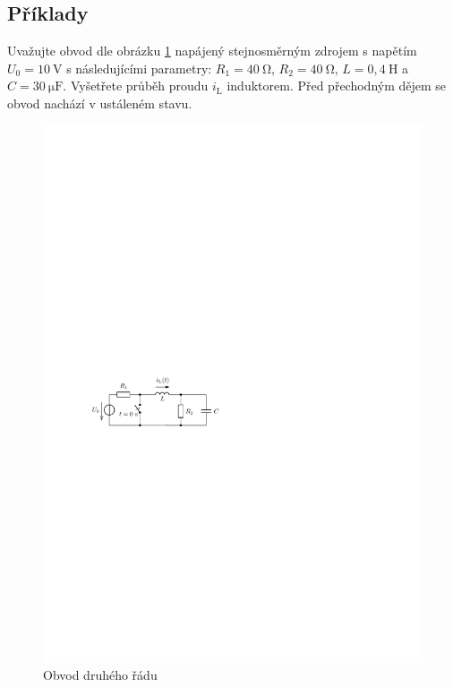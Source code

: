 \subsection{Příklady}

Uvažujte obvod dle obrázku \ref{fig:druhy_rad_priklad_1} napájený stejnosměrným zdrojem s napětím $U_0 = 10~\mathrm{V}$ s následujícími parametry: $R_1 = 40~\mathrm{\Omega}$, $R_2 = 40~\mathrm{\Omega}$, $L = 0,4~\mathrm{H}$ a $C = 30~\mathrm{\mu F}$. Vyšetřete průběh proudu $i_\mathrm{L}$ induktorem. Před přechodným dějem se obvod nachází v ustáleném stavu.
\begin{figure}[h!]
\centering
\includegraphics[]{prechodne_jevy/druhy_rad/priklad_1.pdf}
\caption{Obvod druhého řádu}
\label{fig:druhy_rad_priklad_1}
\end{figure}
